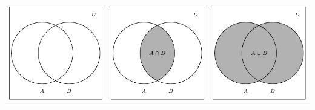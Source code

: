 \documentclass[11pt]{article}
\theoremstyle{definition}  %
\begin{document}
\begin{center}

\begin{tabular}{ccc}


\includegraphics{SetTheory-2}



&

\hspace{0.15in}

\includegraphics{SetTheory-3}

&

\hspace{0.15in}

\includegraphics{SetTheory-4}


\end{tabular}
\end{center}
\end{document}

